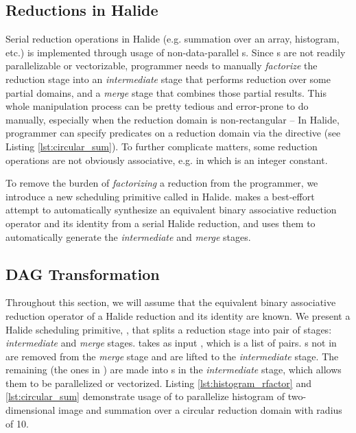 \subsection{Reductions in Halide}

Serial reduction operations in Halide (e.g. summation over an array, histogram, etc.) is implemented through usage of non-data-parallel s. Since s are not readily parallelizable or vectorizable, programmer needs to manually \emph{factorize} the reduction stage into an \emph{intermediate} stage that performs reduction over some partial domains, and a \emph{merge} stage that combines those partial results. This whole manipulation process can be pretty tedious and error-prone to do manually, especially when the reduction domain is non-rectangular -- In Halide, programmer can specify predicates on a reduction domain via the  directive (see Listing \ref{lst:circular_sum}). To further complicate matters, some reduction operations are not obviously associative, e.g.  in which  is an integer constant.

To remove the burden of \emph{factorizing} a reduction from the programmer, we introduce a new scheduling primitive called  in Halide.  makes a best-effort attempt to automatically synthesize an equivalent binary associative reduction operator and its identity from a serial Halide reduction, and uses them to automatically generate the \emph{intermediate} and \emph{merge} stages.

\subsection{ DAG Transformation}

Throughout this section, we will assume that the equivalent binary associative reduction operator of a Halide reduction and its identity are known. We present a Halide scheduling primitive, , that splits a reduction stage into pair of stages: \emph{intermediate} and \emph{merge} stages.  takes as input , which is a list of  pairs. s not in  are removed from the \emph{merge} stage and are lifted to the \emph{intermediate} stage. The remaining  (the ones in ) are made into s in the \emph{intermediate} stage, which allows them to be parallelized or vectorized. Listing \ref{lst:histogram_rfactor} and \ref{lst:circular_sum} demonstrate usage of  to parallelize histogram of two-dimensional image and summation over a circular reduction domain with radius of 10. 

